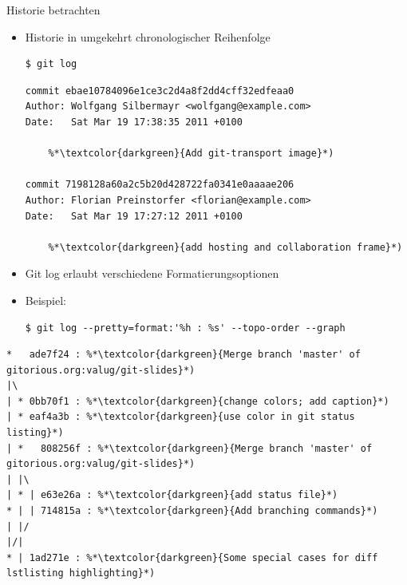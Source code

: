 \begin{frame}{Historie betrachten}
  \begin{itemize}
    \item Historie in umgekehrt chronologischer Reihenfolge
    \begin{lstlisting}
$ git log
    \end{lstlisting}
  \begin{lstlisting}[frame=single]
commit ebae10784096e1ce3c2d4a8f2dd4cff32edfeaa0
Author: Wolfgang Silbermayr <wolfgang@example.com>
Date:   Sat Mar 19 17:38:35 2011 +0100

    %*\textcolor{darkgreen}{Add git-transport image}*)

commit 7198128a60a2c5b20d428722fa0341e0aaaae206
Author: Florian Preinstorfer <florian@example.com>
Date:   Sat Mar 19 17:27:12 2011 +0100

    %*\textcolor{darkgreen}{add hosting and collaboration frame}*)
  \end{lstlisting}
  \framebreak

    \item Git log erlaubt verschiedene Formatierungsoptionen
    \item Beispiel:
    \begin{lstlisting}
$ git log --pretty=format:'%h : %s' --topo-order --graph
    \end{lstlisting}
  \end{itemize}
  \begin{lstlisting}[frame=single]
*   ade7f24 : %*\textcolor{darkgreen}{Merge branch 'master' of gitorious.org:valug/git-slides}*)
|\  
| * 0bb70f1 : %*\textcolor{darkgreen}{change colors; add caption}*)
| * eaf4a3b : %*\textcolor{darkgreen}{use color in git status listing}*)
| *   808256f : %*\textcolor{darkgreen}{Merge branch 'master' of gitorious.org:valug/git-slides}*)
| |\  
| * | e63e26a : %*\textcolor{darkgreen}{add status file}*)
* | | 714815a : %*\textcolor{darkgreen}{Add branching commands}*)
| |/  
|/|   
* | 1ad271e : %*\textcolor{darkgreen}{Some special cases for diff lstlisting highlighting}*)
  \end{lstlisting}
\end{frame}

